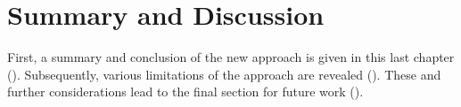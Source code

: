\chapter{Summary and Discussion} \label{ch:summaryanddiscussion}
%
First, a summary and conclusion of the new approach is given in this last chapter ().
Subsequently, various limitations of the \usgan approach are revealed ().
These and further considerations lead to the final section for future work ().





